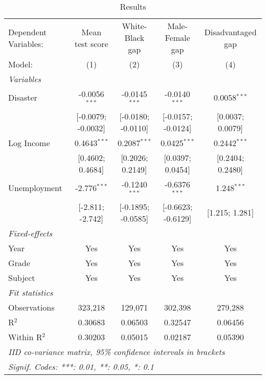 
\begin{table}[htbp]
   \centering
   \caption{\label{MainResults} Results}
   \begin{tabular}{lcccc}
      \tabularnewline\midrule\midrule
      Dependent Variables: & Mean test score    & White-Black gap    & Male-Female gap    & Disadvantaged gap\\
      Model:               & (1)                & (2)                & (3)                & (4)\\
      \midrule \emph{Variables} &   &   &   &  \\
      Disaster             & -0.0056$^{***}$    & -0.0145$^{***}$    & -0.0140$^{***}$    & 0.0058$^{***}$\\
                           & [-0.0079; -0.0032] & [-0.0180; -0.0110] & [-0.0157; -0.0124] & [0.0037; 0.0079]\\
      Log Income           & 0.4643$^{***}$     & 0.2087$^{***}$     & 0.0425$^{***}$     & 0.2442$^{***}$\\
                           & [0.4602; 0.4684]   & [0.2026; 0.2149]   & [0.0397; 0.0454]   & [0.2404; 0.2480]\\
      Unemployment         & -2.776$^{***}$     & -0.1240$^{***}$    & -0.6376$^{***}$    & 1.248$^{***}$\\
                           & [-2.811; -2.742]   & [-0.1895; -0.0585] & [-0.6623; -0.6129] & [1.215; 1.281]\\
      \midrule \emph{Fixed-effects} &   &   &   &  \\
      Year                 & Yes                & Yes                & Yes                & Yes\\
      Grade                & Yes                & Yes                & Yes                & Yes\\
      Subject              & Yes                & Yes                & Yes                & Yes\\
      \midrule \emph{Fit statistics} &   &   &   &  \\
      Observations         & 323,218            & 129,071            & 302,398            & 279,288\\
      R$^2$                & 0.30683            & 0.06503            & 0.32547            & 0.06456\\
      Within R$^2$         & 0.30203            & 0.05015            & 0.02187            & 0.05390\\
      \midrule\midrule\multicolumn{5}{l}{\emph{IID co-variance matrix, 95\% confidence intervals in brackets}}\\
      \multicolumn{5}{l}{\emph{Signif. Codes: ***: 0.01, **: 0.05, *: 0.1}}\\
   \end{tabular}
\end{table}


